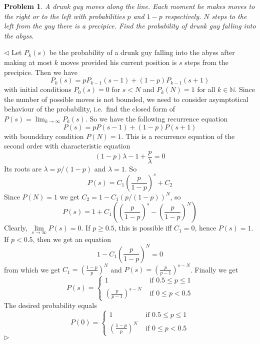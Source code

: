 \documentclass[12pt]{article}
\newtheorem{problem}{Problem}[subsection]
\newenvironment{solution}{\par $\triangleleft$}{$\triangleright$}
\begin{document}
\begin{problem} A drunk guy moves along the line. Each moment he makes moves to
the right or to the left with probabilities $p$ and $1-p$ respectively. $N$
steps to the left from the guy there is a precipice. Find the probability of
drunk guy falling into the abyss.
\end{problem}
\begin{solution} Let $P_k(s)$ be the probability of a drunk guy falling into the
    abyss after making at most $k$ moves provided his current position is $s$
    steps from the precipice. Then we have
    $$
        P_k(s)=pP_{k-1}(s-1)+(1-p)P_{k-1}(s+1)
    $$
    with initial conditions $P_0(s)=0$ for $s<N$ and $P_k(N)=1$ for all
    $k\in\mathbb{N}$. Since the number of possible moves is not bounded, we need
    to consider asymptotical behaviour of the probability, i.e.\ find the closed
    form of $P(s)=\lim_{k\to\infty} P_k(s)$. So we have the following recurrence
    equation
    $$
        P(s)=pP(s-1)+(1-p)P(s+1)
    $$
    with bounddary condition $P(N)=1$. This is a recurrence equation of the
    second order with characteristic equation
    $$
        (1-p)\lambda-1+\frac{p}{\lambda}=0
    $$
    Its roots are $\lambda=p/(1-p)$ and $\lambda=1$. So
    $$
        P(s)=C_1{\left(\frac{p}{1-p}\right)}^s+C_2
    $$
    Since $P(N)=1$ we get $C_2=1-C_1{(p/(1-p))}^N$, so
    $$
        P(s)=1+C_1\left({\left(\frac{p}{1-p}\right)}^s
        -{\left(\frac{p}{1-p}\right)}^N\right)
    $$
    Clearly, $\lim\limits_{s\to\infty}P(s)=0$. If $p\geq 0.5$, this is possible
    iff $C_1=0$, hence $P(s)=1$. If $p<0.5$, then we get an equation
    $$
        1-C_1{\left(\frac{p}{1-p}\right)}^N=0
    $$
    from which we get $C_1={\left(\frac{1-p}{p}\right)}^N$ and
    $P(s)={\left(\frac{p}{p-1}\right)}^{s-N}$. Finally we get
    $$
        P(s)=\begin{cases}
            1                                  &
            \mbox{ if } 0.5 \leq p \leq 1        \\
            {\left(\frac{p}{p-1}\right)}^{s-N} &
            \mbox{ if } 0 \leq p < 0.5
        \end{cases}
    $$
    The desired  probability equals
    $$
        P(0)=\begin{cases}
            1                                &
            \mbox{ if } 0.5 \leq p \leq 1      \\
            {\left(\frac{1-p}{p}\right)}^{N} &
            \mbox{ if }0 \leq p <0.5
        \end{cases}
    $$
\end{solution}
\end{document}
